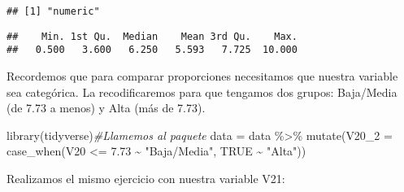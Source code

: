 \documentclass[
]{article}
\newenvironment{Shaded}{\begin{snugshade}}{\end{snugshade}}
\newcommand{\AttributeTok}[1]{\textcolor[rgb]{0.77,0.63,0.00}{#1}}
\newcommand{\CommentTok}[1]{\textcolor[rgb]{0.56,0.35,0.01}{\textit{#1}}}
\newcommand{\ConstantTok}[1]{\textcolor[rgb]{0.00,0.00,0.00}{#1}}
\newcommand{\FloatTok}[1]{\textcolor[rgb]{0.00,0.00,0.81}{#1}}
\newcommand{\FunctionTok}[1]{\textcolor[rgb]{0.00,0.00,0.00}{#1}}
\newcommand{\NormalTok}[1]{#1}
\newcommand{\OtherTok}[1]{\textcolor[rgb]{0.56,0.35,0.01}{#1}}
\newcommand{\SpecialCharTok}[1]{\textcolor[rgb]{0.00,0.00,0.00}{#1}}
\newcommand{\StringTok}[1]{\textcolor[rgb]{0.31,0.60,0.02}{#1}}
\begin{document}
\begin{Shaded}
\end{Shaded}

\begin{verbatim}
## [1] "numeric"
\end{verbatim}

\begin{Shaded}
\end{Shaded}

\begin{verbatim}
##    Min. 1st Qu.  Median    Mean 3rd Qu.    Max. 
##   0.500   3.600   6.250   5.593   7.725  10.000
\end{verbatim}

Recordemos que para comparar proporciones necesitamos que nuestra
variable sea categórica. La recodificaremos para que tengamos dos
grupos: Baja/Media (de 7.73 a menos) y Alta (más de 7.73).

\begin{Shaded}
\begin{Highlighting}[]
\FunctionTok{library}\NormalTok{(tidyverse)}\CommentTok{\#Llamemos al paquete}
\NormalTok{data }\OtherTok{=}\NormalTok{ data }\SpecialCharTok{\%\textgreater{}\%}
  \FunctionTok{mutate}\NormalTok{(}\AttributeTok{V20\_2 =} \FunctionTok{case\_when}\NormalTok{(V20 }\SpecialCharTok{\textless{}=} \FloatTok{7.73} \SpecialCharTok{\textasciitilde{}} \StringTok{"Baja/Media"}\NormalTok{,}
                          \ConstantTok{TRUE} \SpecialCharTok{\textasciitilde{}} \StringTok{"Alta"}\NormalTok{))}
\end{Highlighting}
\end{Shaded}

Realizamos el mismo ejercicio con nuestra variable V21:

\begin{Shaded}
\end{Shaded}
\end{document}
